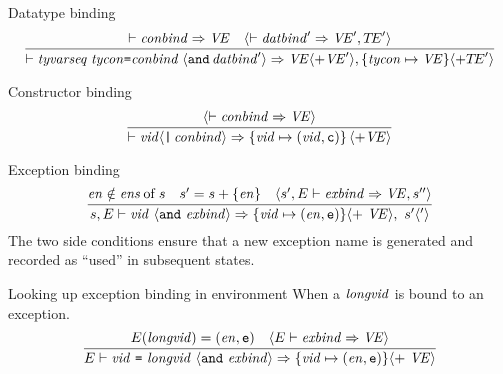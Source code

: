 \begin{inference-rule}{Datatype binding}
\begin{equation}\label{rule:dynamic-core:datatype-binding}
\vcenter{\infer{\ts\tyvarseq\;\tycon\boxml{=}\constrs\;\optional{\boxml{and}\,\datbind'}\ra\VE\optional{+\VE'},\{\tycon\mapsto\VE\}\optional{+\TE'}}
  {\ts\constrs\ra\VE
    & \optional{\ts\datbind'\ra\VE',\TE'}}}
\end{equation}
\end{inference-rule}


\begin{inference-rule}{Constructor binding}
\begin{equation}\label{rule:dynamic-core:constructor-binding}
\vcenter{\infer{\ts\vid\optional{\boxml{|}\,\constrs}\ra
    \{\vid\mapsto(\vid,\isc)\}\,\optional{+\VE}}
  {\optional{\ts\constrs\ra\VE}}}
\end{equation}
\end{inference-rule}


\begin{inference-rule}{Exception binding}
\begin{equation}\label{rule:dynamic-core:exception-binding1}
\vcenter{\infer{\s,\E\ts\longvidexnbindaa\ra\{\vid\mapsto(\e,\ise)\}\optional{ +\ \VE},\
    \s'\optional{'}}
  {\e\notin\of{\excs}{\s}
    & \s'=\s+\{\e\}
    & \optional{\s',\E\ts\exnbind\ra\VE,\s''} }}
\end{equation}
The two side conditions ensure that a new exception name is generated
and recorded as ``used'' in subsequent states.
\end{inference-rule}

\begin{inference-rule}{Looking up exception binding in environment}
When a $\textit{longvid\/}$ is bound to an exception.
\begin{equation}\label{rule:dynamic-core:exception-binding2}
\vcenter{\infer{\E\ts\longvidexnbindb\ra\{\vid\mapsto(\e,\ise)\}\optional{+\ \VE}}
  {\E(\longvid)=(\e,\ise)
    & \optional{\E\ts\exnbind\ra\VE} }}
\end{equation}
\end{inference-rule}


